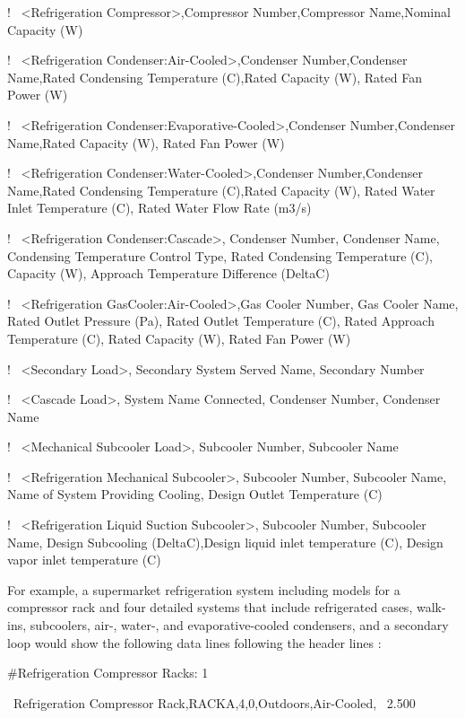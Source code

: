 !~ \textless{}Refrigeration Compressor\textgreater{},Compressor Number,Compressor Name,Nominal Capacity (W)

!~ \textless{}Refrigeration Condenser:Air-Cooled\textgreater{},Condenser Number,Condenser Name,Rated Condensing Temperature (C),Rated Capacity (W), Rated Fan Power (W)

!~ \textless{}Refrigeration Condenser:Evaporative-Cooled\textgreater{},Condenser Number,Condenser Name,Rated Capacity (W), Rated Fan Power (W)

!~ \textless{}Refrigeration Condenser:Water-Cooled\textgreater{},Condenser Number,Condenser Name,Rated Condensing Temperature (C),Rated Capacity (W), Rated Water Inlet Temperature (C), Rated Water Flow Rate (m3/s)

!~ \textless{}Refrigeration Condenser:Cascade\textgreater{}, Condenser Number, Condenser Name, Condensing Temperature Control Type, Rated Condensing Temperature (C), Capacity (W), Approach Temperature Difference (DeltaC)

!~ \textless{}Refrigeration GasCooler:Air-Cooled\textgreater{},Gas Cooler Number, Gas Cooler Name, Rated Outlet Pressure (Pa), Rated Outlet Temperature (C), Rated Approach Temperature (C), Rated Capacity (W), Rated Fan Power (W)

!~ \textless{}Secondary Load\textgreater{}, Secondary System Served Name, Secondary Number

!~ \textless{}Cascade Load\textgreater{}, System Name Connected, Condenser Number, Condenser Name

!~ \textless{}Mechanical Subcooler Load\textgreater{}, Subcooler Number, Subcooler Name

!~ \textless{}Refrigeration Mechanical Subcooler\textgreater{}, Subcooler Number, Subcooler Name, Name of System Providing Cooling, Design Outlet Temperature (C)

!~ \textless{}Refrigeration Liquid Suction Subcooler\textgreater{}, Subcooler Number, Subcooler Name, Design Subcooling (DeltaC),Design liquid inlet temperature (C), Design vapor inlet temperature (C)

For example, a supermarket refrigeration system including models for a compressor rack and four detailed systems that include refrigerated cases, walk-ins, subcoolers, air-, water-, and evaporative-cooled condensers, and a secondary loop would show the following data lines following the header lines :

\#Refrigeration Compressor Racks: 1

~Refrigeration Compressor Rack,RACKA,4,0,Outdoors,Air-Cooled,~ 2.500

